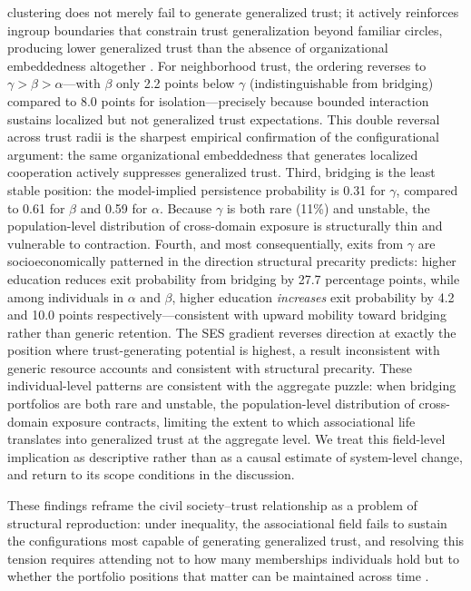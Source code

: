 clustering does not merely fail to generate generalized trust; it actively reinforces ingroup boundaries that constrain trust generalization beyond familiar circles, producing lower generalized trust than the absence of organizational embeddedness altogether \parencite{portes_social_1998,
stolle1998all}. For neighborhood trust, the ordering reverses to $\gamma > \beta > \alpha$---with $\beta$ only 2.2 points below $\gamma$ (indistinguishable from bridging) compared to 8.0 points for isolation---precisely because bounded interaction sustains localized but not generalized trust expectations. This double reversal across trust radii is the sharpest empirical confirmation of the configurational argument: the same organizational embeddedness that generates localized cooperation actively suppresses generalized trust. Third, bridging is the least stable position: the model-implied persistence probability is 0.31 for $\gamma$, compared to 0.61 for $\beta$ and 0.59 for $\alpha$. Because $\gamma$ is both rare (11\%) and unstable, the population-level distribution of cross-domain exposure is structurally thin and vulnerable to contraction. Fourth, and most consequentially, exits from $\gamma$ are socioeconomically patterned in the direction structural precarity predicts: higher education reduces exit probability from bridging by 27.7 percentage points, while among individuals in $\alpha$ and $\beta$, higher education \textit{increases} exit probability by 4.2 and 10.0 points respectively---consistent with upward mobility toward bridging rather than generic retention. The SES gradient reverses direction at exactly the position where trust-generating potential is highest, a result inconsistent with generic resource accounts and consistent with structural precarity. These individual-level patterns are consistent with the aggregate puzzle: when bridging portfolios are both rare and unstable, the population-level distribution of cross-domain exposure contracts, limiting the extent to which associational life translates into generalized trust at the aggregate level. We treat this field-level implication as descriptive rather than as a causal estimate of system-level change, and return to its scope conditions in the discussion.

These findings reframe the civil society--trust relationship as a problem of structural reproduction: under inequality, the associational field fails to sustain the configurations most capable of generating generalized trust, and resolving this tension requires attending not to how many memberships individuals hold but to whether the portfolio positions that matter can be maintained across time \parencite{coleman_social_1988, putnam_bowling_2000,
paxton_association_2007}.


